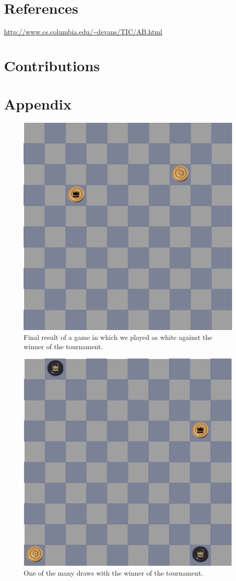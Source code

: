 \documentclass[11pt,a4paper]{article}
\begin{document}
\section{References}
\url{http://www.cs.columbia.edu/~devans/TIC/AB.html}

\section{Contributions}

\section{Appendix}
\begin{figure}[h!]
\centering
\includegraphics{win_with_42.png}
\caption{Final result of a game in which we played as white against the winner of the tournament.}
\label{fig:win42}
\end{figure}
\begin{figure}[h!]
\centering
\includegraphics{draw_with_42.png}
\caption{One of the many draws with the winner of the tournament.}
\label{fig:draw42}
\end{figure}
\end{document}
